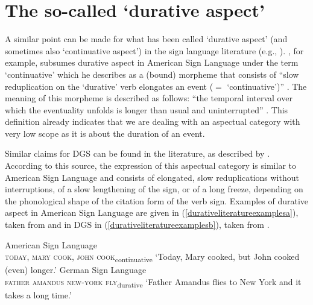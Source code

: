 \section{The so-called `durative aspect'}\label{durativecontinuative}
A similar point can be made for what has been called `durative aspect' (and sometimes also `continuative aspect') in the sign language literature (e.g., \citealt{rathmann2005event,brunelli2011antisymmetry}). \citet{rathmann2005event}, for example, subsumes durative aspect in American Sign Language under the term `continuative' which he describes as a (bound) morpheme that consists of ``slow reduplication on the `durative' verb elongates an event ($=$ `continuative')'' \citep[27]{rathmann2005event}. The meaning of this morpheme is described as follows: ``the temporal interval over which the eventuality unfolds is longer than usual and uninterrupted'' \citep[36]{rathmann2005event}. This definition already indicates that we are dealing with an aspectual category with very low scope as it is about the duration of an event.


Similar claims for DGS can be found in the literature, as described by \citet[145, 282]{happ2014vork}. According to this source, the expression of this aspectual category is similar to American Sign Language and consists of elongated, slow reduplications without interruptions, of a slow lengthening of the sign, or of a long freeze, depending on the phonological shape of the citation form of the verb sign. Examples of durative aspect in American Sign Language are given in (\ref{durativeliteratureexamplesa}), taken from \citet[35]{rathmann2005event} and in DGS in (\ref{durativeliteratureexamplesb}), taken from \citet[145]{happ2014vork}.

\begin{exe}
\ex  \label{ex:durativeliteratureexamples}\begin{xlist} 
\ex American Sign Language \citep[35]{rathmann2005event} \\ {\textsc{today, mary cook, john cook}\textsubscript{continuative}} 
\glt `Today, Mary cooked, but John cooked (even) longer.' \label{durativeliteratureexamplesa}
\ex German Sign Language \citep[146]{happ2014vork} \\ {\textsc{father amandus new-york fly}\textsubscript{durative}}
\glt `Father Amandus flies to New York and it takes a long time.' \label{durativeliteratureexamplesb}
\end{xlist}
\end{exe}

